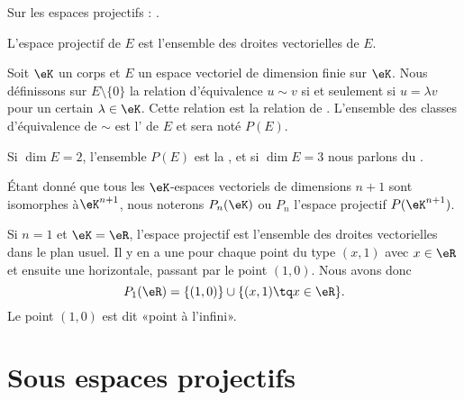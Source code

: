 
Sur les espaces projectifs : \cite{ProjRolland}.

L'espace projectif de \( E\) est l'ensemble des droites vectorielles de \( E\).
\begin{definition}
    Soit \( \eK\) un corps et \( E\) un espace vectoriel de dimension finie sur \( \eK\). Nous définissons sur \( E\setminus\{ 0 \}\) la relation d'équivalence \( u\sim v\) si et seulement si \( u=\lambda v\) pour un certain \( \lambda\in\eK\). Cette relation est la relation de . L'ensemble des classes d'équivalence de \( \sim\) est l' de \( E\) et sera noté \( P(E)\).
\end{definition}

Si \( \dim E=2\), l'ensemble \( P(E)\) est la , et si \( \dim E=3\) nous parlons du .

Étant donné que tous les \( \eK\)-espaces vectoriels de dimensions \( n+1\) sont isomorphes à\( \eK^{n+1}\), nous noterons \( P_n(\eK)\) ou \( P_n\) l'espace projectif \( P(\eK^{n+1})\).

\begin{example}
    Si \( n=1\) et \( \eK=\eR\), l'espace projectif est l'ensemble des droites vectorielles dans le plan usuel. Il y en a une pour chaque point du type \( (x,1)\) avec \( x\in\eR\) et ensuite une horizontale, passant par le point \( (1,0)\). Nous avons donc
    \begin{equation}
        P_1(\eR)=\{ (1,0) \}\cup\{ (x,1)\tq x\in \eR \}.
    \end{equation}
    Le point \( (1,0)\) est dit «point à l'infini».
\end{example}

\section{Sous espaces projectifs}

